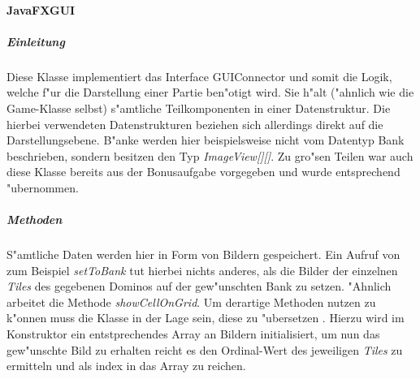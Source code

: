\paragraph{JavaFXGUI}
\label{par:javaFXGUI}

\subparagraph{Einleitung}
Diese Klasse implementiert das Interface GUIConnector und somit die Logik, welche f"ur die Darstellung einer Partie ben"otigt wird. Sie h"alt ("ahnlich wie die Game-Klasse selbst) s"amtliche Teilkomponenten in einer Datenstruktur. Die hierbei verwendeten Datenstrukturen beziehen sich allerdings direkt auf die Darstellungsebene. B"anke werden hier beispielsweise nicht vom Datentyp Bank beschrieben, sondern besitzen den Typ \emph{ImageView[][]}. Zu gro"sen Teilen war auch diese Klasse bereits aus der Bonusaufgabe vorgegeben und wurde entsprechend "ubernommen. 

\subparagraph{Methoden}
S"amtliche Daten werden hier in Form von Bildern gespeichert. Ein Aufruf von zum Beispiel \emph{setToBank} tut hierbei nichts anderes, als die Bilder der einzelnen \emph{Tiles} des gegebenen Dominos auf der gew"unschten Bank zu setzen. "Ahnlich arbeitet die Methode \emph{showCellOnGrid}. Um derartige Methoden nutzen zu k"onnen muss die Klasse in der Lage sein, diese zu \glqq "ubersetzen \grqq . Hierzu wird im Konstruktor ein entstprechendes Array an Bildern initialisiert, um nun das gew"unschte Bild zu erhalten reicht es den Ordinal-Wert des jeweiligen \emph{Tiles} zu ermitteln und als index in das Array zu reichen. 